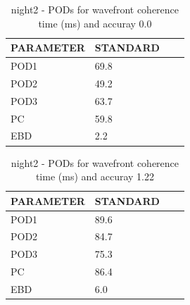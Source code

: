 \begin{table}[p!]
\begin{center}
\begin{tabular}{|l|l|l|l|}
\hline
\multicolumn{1}{|c|}{\cellcolor[HTML]{C0C0C0}\textbf{PARAMETER}} & \multicolumn{1}{c|}{\cellcolor[HTML]{C0C0C0}\textbf{STANDARD}} \\
\hline
\cellcolor[HTML]{C0C0C0}POD1  & 69.8                                \\
\cellcolor[HTML]{C0C0C0}POD2  & 49.2                                \\
\cellcolor[HTML]{C0C0C0}POD3  & 63.7                                \\
\cellcolor[HTML]{C0C0C0}PC    & 59.8                                  \\
\cellcolor[HTML]{C0C0C0}EBD   & 2.2                                 \\
\hline
\end{tabular}
\caption{night2 - PODs for wavefront coherence time (ms) and accuray 0.0}
\label{tab:podtau0.0:night2}
\end{center}
\end{table}
\begin{table}[p!]
\begin{center}
\begin{tabular}{|l|l|l|l|}
\hline
\multicolumn{1}{|c|}{\cellcolor[HTML]{C0C0C0}\textbf{PARAMETER}} & \multicolumn{1}{c|}{\cellcolor[HTML]{C0C0C0}\textbf{STANDARD}} \\
\hline
\cellcolor[HTML]{C0C0C0}POD1  & 89.6                                \\
\cellcolor[HTML]{C0C0C0}POD2  & 84.7                                \\
\cellcolor[HTML]{C0C0C0}POD3  & 75.3                                \\
\cellcolor[HTML]{C0C0C0}PC    & 86.4                                  \\
\cellcolor[HTML]{C0C0C0}EBD   & 6.0                                 \\
\hline
\end{tabular}
\caption{night2 - PODs for wavefront coherence time (ms) and accuray 1.22}
\label{tab:podtau1.22:night2}
\end{center}
\end{table}
